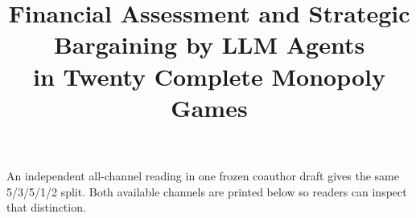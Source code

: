 \title{Financial Assessment and Strategic Bargaining by LLM Agents\\in Twenty Complete Monopoly Games}

An independent all-channel reading in one frozen coauthor draft gives the same 5/3/5/1/2 split. Both available channels are printed below so readers can inspect that distinction.

